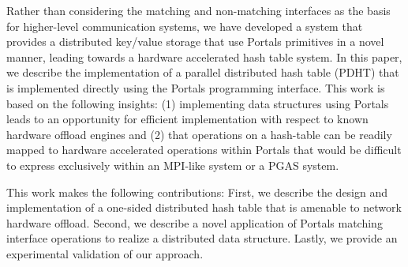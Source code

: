 Rather than considering the matching and non-matching interfaces as
the basis for higher-level communication systems, we have developed a
system that provides a distributed key/value storage that use Portals
primitives in a novel manner, leading towards a hardware accelerated
hash table system. In this paper, we describe the implementation of a
parallel distributed hash table (PDHT) that is implemented directly
using the Portals programming interface. This work is based on the
following insights: (1) implementing data structures using Portals
leads to an opportunity for efficient implementation with respect to
known hardware offload engines and (2) that operations on a hash-table
can be readily mapped to hardware accelerated operations within
Portals that would be difficult to express exclusively within an
MPI-like system or a PGAS system.

This work makes the following contributions: First, we describe the
design and implementation of a one-sided distributed hash table that
is amenable to network hardware offload. Second, we describe a novel
application of Portals matching interface operations to realize a
distributed data structure. Lastly, we provide an experimental validation of
our approach.




